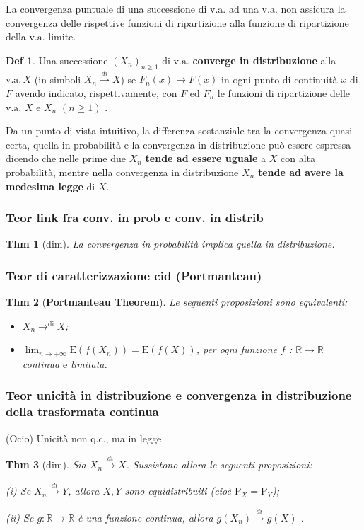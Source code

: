 \documentclass[a4paper,11pt]{article}
\theoremstyle{plain}
\newtheorem{thm}{Thm}[section]
\theoremstyle{definition}
\newtheorem{defn}{Def}[section]
\theoremstyle{remark}
\begin{document}
La convergenza puntuale di una successione di $\mathrm{v}.\mathrm{a}$. ad una $\mathrm{v}.\mathrm{a}$. non assicura la convergenza delle rispettive funzioni di ripartizione alla funzione di ripartizione della $\mathrm{v}.\mathrm{a}$. limite.

\begin{defn}
Una successione $(X_{n})_{n\geq 1}$ di $\mathrm{v}.\mathrm{a}$. \textbf{converge in distribuzione} alla $\mathrm{v}.\mathrm{a}.\,  X$ (in simboli $X_{n} \overset{di}{\rightarrow} X$) se $F_{n}(x)\rightarrow F(x)$ in ogni punto di continuità $x$ di $F$ avendo indicato, rispettivamente, con $F$ ed $F_{n}$ le funzioni di ripartizione delle $\mathrm{v}.\mathrm{a}$. $X$ e  $X_{n}$ $(n\geq 1)$ .
\end{defn}

Da un punto di vista intuitivo, la differenza sostanziale tra la convergenza quasi certa, quella in probabilità $\mathrm{e}$ la convergenza in distribuzione può essere espressa dicendo che nelle prime due $X_{n}$ \textbf{tende ad essere uguale} a $X$ con alta probabilità, mentre nella convergenza in distribuzione $X_{n}$ \textbf{tende ad avere la medesima legge} di $X.$

\subsubsection{Teor link fra conv. in prob e conv. in distrib}
\begin{thm}[dim]
La convergenza in probabilità implica quella in distribuzione.
\end{thm}

\subsubsection{Teor di caratterizzazione cid (Portmanteau) }
\begin{thm}[\textbf{Portmanteau Theorem}] 
Le seguenti proposizioni sono equivalenti:
\begin{itemize}
    \item $X_{n}\rightarrow^{\mathrm{d}\mathrm{i}} X$;
    \item $\displaystyle \lim_{n\rightarrow+\infty}\mathrm{E}(f(X_{n}))=\mathrm{E}(f(X))$, per ogni funzione $f$ : $\mathbb{R}\rightarrow \mathbb{R}$ continua $\mathrm{e}$ limitata.
\end{itemize}
\end{thm}


\subsubsection{Teor unicità in distribuzione e convergenza in distribuzione della trasformata continua}
 (Ocio) Unicità non q.c., ma  in legge
\begin{thm}[dim]
Sia $X_{n}\overset{di}{\rightarrow} X$. Sussistono allora le seguenti proposizioni:

(i) Se $X_{n}\overset{di}{\rightarrow} Y$, allora $X, Y$ sono equidistribuiti (cioè $\mathrm{P}_{X}=\mathrm{P}_{Y}$);

(ii) Se $g:\mathbb{R}\rightarrow \mathbb{R}$ è una funzione continua, allora $g(X_{n})\overset{di}{\rightarrow} g(X)$ .
\end{thm}
\end{document}
